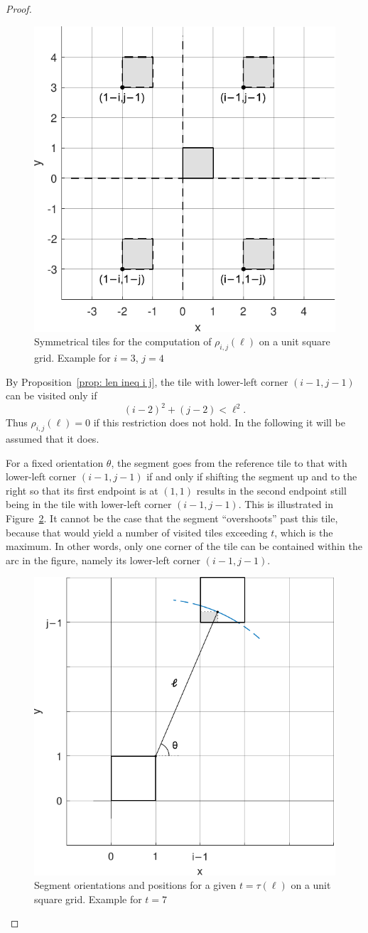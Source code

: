 \documentclass[12pt, a4paper]{article}
\newcommand{\funt}{\tau} %
\newcommand{\probmax}{\rho} %
\newcommand{\len}{\ell} %
\newcommand{\tiles}{t} %
\begin{document}
\begin{proof}
\begin{figure}
\centering%
\includegraphics[width=.53\textwidth]{probmax_symmetric_tiles}%
\caption{Symmetrical tiles for the computation of $\probmax_{i,j}(\len)$ on a unit square grid. Example for $i=3$, $j=4$%
}%
\label{fig: probmax_symmetric_tiles}%
\end{figure}%

By Proposition~\ref{prop: len ineq i j}, the tile with lower-left corner $(i-1,j-1)$ can be visited only if
\begin{equation}
\label{eq: i-2 j-2 len}
(i-2)^2+(j-2)<\len^2.
\end{equation}
Thus $\probmax_{i,j}(\len)=0$ if this restriction does not hold. In the following it will be assumed that it does.

For a fixed orientation $\theta$, the segment goes from the reference tile to that with lower-left corner $(i-1,j-1)$ if and only if shifting the segment up and to the right so that its first endpoint is at $(1,1)$ results in the second endpoint still being in the tile with lower-left corner $(i-1,j-1)$. This is illustrated in Figure~\ref{fig: probmax_funt_odd}. It cannot be the case that the segment ``overshoots'' past this tile, because that would yield a number of visited tiles exceeding $\tiles$, which is the maximum. In other words, only one corner of the tile can be contained within the arc in the figure, namely its lower-left corner $(i-1,j-1)$.

\begin{figure}
\centering
\includegraphics[width=.56\textwidth]{probmax_funt_odd}%
\caption{Segment orientations and positions for a given $\tiles = \funt(\len)$ on a unit square grid. Example for $\tiles = 7$
}%
\label{fig: probmax_funt_odd}%
\end{figure}%


\end{proof}
\end{document}
